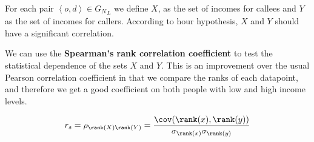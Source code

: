 For each pair \( \left< o, d \right> \in {G_N}_L \) we define \( X \), as the set of incomes for callees and \( Y \) as the set of incomes for callers. According to hour hypothesis, \( X \) and \( Y \) should have a significant correlation.

We can use the \textbf{Spearman's rank correlation coefficient} to test the statistical dependence of the sets \( X \) and \( Y \). This is an improvement over the usual Pearson correlation coefficient in that we compare the ranks of each datapoint, and therefore we get a good coefficient on both people with low and high income levels.

\[
r_s = \rho_{\rank(X) \rank(Y)} = \frac{\cov(\rank(x), \rank(y))}{\sigma_{\rank(x)} \sigma_{\rank(y)}}
\]